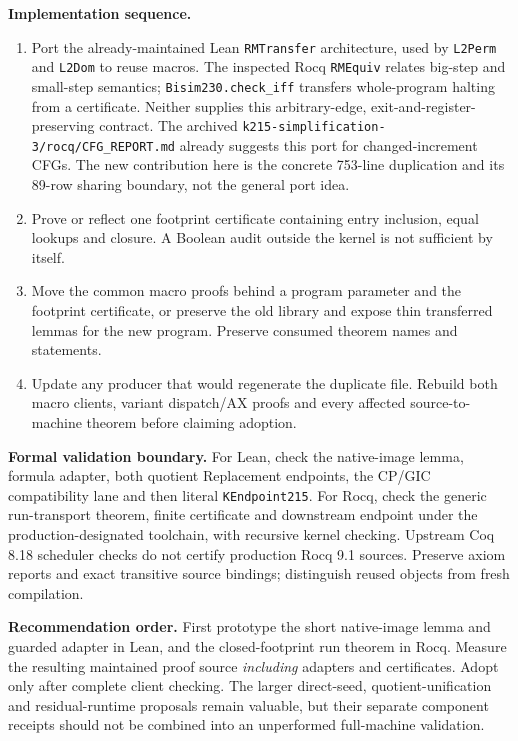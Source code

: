 \documentclass[10pt]{article}
\newcommand{\code}[1]{\texttt{#1}}
\begin{document}
\textbf{Implementation sequence.}
\begin{enumerate}
\item Port the already-maintained Lean \code{RMTransfer} architecture, used by \code{L2Perm} and \code{L2Dom} to reuse macros. The inspected Rocq \code{RMEquiv} relates big-step and small-step semantics; \code{Bisim230.check\_iff} transfers whole-program halting from a certificate. Neither supplies this arbitrary-edge, exit-and-register-preserving contract. The archived \code{k215-simplification-3/rocq/CFG\_REPORT.md} already suggests this port for changed-increment CFGs. The new contribution here is the concrete 753-line duplication and its 89-row sharing boundary, not the general port idea.
\item Prove or reflect one footprint certificate containing entry inclusion, equal lookups and closure. A Boolean audit outside the kernel is not sufficient by itself.
\item Move the common macro proofs behind a program parameter and the footprint certificate, or preserve the old library and expose thin transferred lemmas for the new program. Preserve consumed theorem names and statements.
\item Update any producer that would regenerate the duplicate file. Rebuild both macro clients, variant dispatch/AX proofs and every affected source-to-machine theorem before claiming adoption.
\end{enumerate}

\textbf{Formal validation boundary.} For Lean, check the native-image lemma, formula adapter, both quotient Replacement endpoints, the CP/GIC compatibility lane and then literal \code{KEndpoint215}. For Rocq, check the generic run-transport theorem, finite certificate and downstream endpoint under the production-designated toolchain, with recursive kernel checking. Upstream Coq 8.18 scheduler checks do not certify production Rocq 9.1 sources. Preserve axiom reports and exact transitive source bindings; distinguish reused objects from fresh compilation.

\textbf{Recommendation order.} First prototype the short native-image lemma and guarded adapter in Lean, and the closed-footprint run theorem in Rocq. Measure the resulting maintained proof source \emph{including} adapters and certificates. Adopt only after complete client checking. The larger direct-seed, quotient-unification and residual-runtime proposals remain valuable, but their separate component receipts should not be combined into an unperformed full-machine validation.
\end{document}
